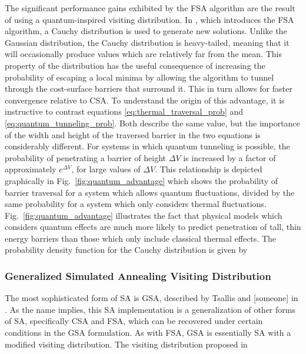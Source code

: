 \documentclass[11pt]{afthesis}
\begin{document}
	 The significant performance gains exhibited by the FSA algorithm are the result of using a quantum-inspired visiting distribution. In \cite{szu1987fastsimulatedannealing}, which introduces the FSA algorithm, a Cauchy distribution is used to generate new solutions. Unlike the Gaussian distribution, the Cauchy distribution is heavy-tailed, meaning that it will occasionally produce values which are relatively far from the mean.  This property of the distribution has the useful consequence of increasing the probability of escaping a local minima by allowing the algorithm to tunnel through the cost-surface barriers that surround it. This in turn allows for faster convergence relative to CSA. To understand the origin of this advantage, it is instructive to contrast equations \ref{eq:thermal_traversal_prob} and \ref{eq:quantum_tunneling_prob}. Both describe the same value, but the importance of the width and height of the traversed barrier in the two equations is considerably different. For systems in which quantum tunneling is possible, the probability of penetrating a barrier of height \begin{math} \Delta V \end{math} is increased by a factor of approximately \begin{math} e^{\Delta V} \end{math}, for large values of \begin{math} \Delta V \end{math}. This relationship is depicted graphically in Fig.~\ref{fig:quantum_advantage} which shows the probability of barrier traversal for a system which allows quantum fluctuations, divided by the same probability for a system which only considers thermal fluctuations. Fig.~\ref{fig:quantum_advantage} illustrates the fact that physical models which considers quantum effects are much more likely to predict penetration of tall, thin energy barriers than those which only include classical thermal effects. 
	 The probability density function for the Cauchy distribution is given by
	 

	

	\subsubsection{Generalized Simulated Annealing Visiting Distribution}
	
	The most sophisticated form of SA is GSA, described by Tsallis and [someone] in \cite{tsallis1996generalizedsimulatedannealing}. As the name implies, this SA implementation is a generalization of other forms of SA, specifically CSA and FSA, which can be recovered under certain conditions in the GSA formulation. As with FSA, GSA is essentially SA with a modified visiting distribution. The visiting distribution proposed in 
	
\end{document}
